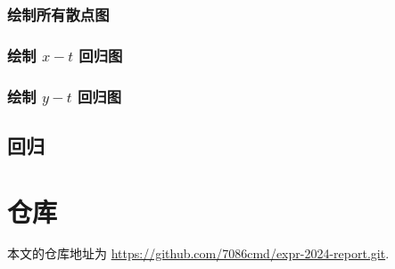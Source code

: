 \documentclass{article}
\begin{document}
\begin{appendices}


\subsubsection{绘制所有散点图}



\subsubsection{绘制 $x-t$ 回归图}



\subsubsection{绘制 $y-t$ 回归图}



\subsection{回归}



\section{仓库}

本文的仓库地址为 \url{https://github.com/7086cmd/expr-2024-report.git}.

\end{appendices}
\end{document}

